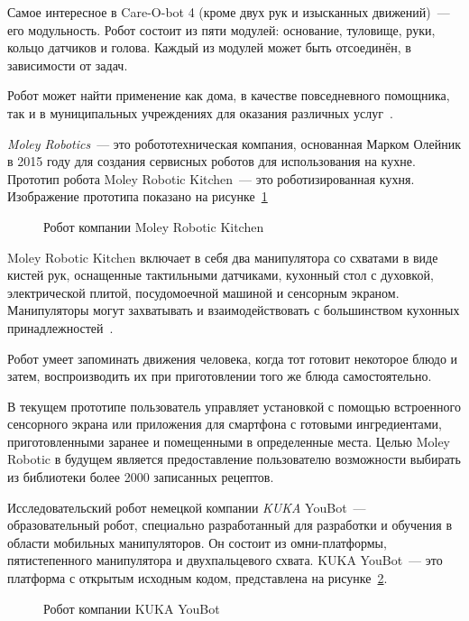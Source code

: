 Самое интересное в Care-O-bot 4 (кроме двух рук и изысканных движений)~--- его модульность. Робот состоит из пяти модулей: основание, туловище, руки, кольцо датчиков и голова. Каждый из модулей может быть отсоединён, в зависимости от задач.

Робот может найти применение как дома, в качестве повседневного помощника, так и в муниципальных учреждениях для оказания различных услуг~\cite{review}.

\textit{Moley Robotics}~--- это робототехническая компания, основанная Марком Олейник в 2015 году для создания сервисных роботов для использования на кухне. Прототип робота Moley Robotic Kitchen~--- это роботизированная кухня. Изображение прототипа показано на рисунке~\ref{img:moley}

\begin{figure}[h!]
	\caption{Робот компании Moley Robotic Kitchen}
	\label{img:moley}
\end{figure}

Moley Robotic Kitchen включает в себя два манипулятора со схватами в виде кистей рук, оснащенные тактильными датчиками, кухонный стол с духовкой, электрической плитой, посудомоечной машиной и сенсорным экраном. Манипуляторы могут захватывать и взаимодействовать с большинством кухонных принадлежностей~\cite{moley}.

Робот умеет запоминать движения человека, когда тот готовит некоторое блюдо и затем, воспроизводить их при приготовлении того же блюда самостоятельно.

В текущем прототипе пользователь управляет установкой с помощью встроенного сенсорного экрана или приложения для смартфона с готовыми ингредиентами, приготовленными заранее и помещенными в определенные места. Целью Moley Robotic в будущем является предоставление пользователю возможности выбирать из библиотеки более 2000 записанных рецептов.

Исследовательский робот немецкой компании \textit{KUKA} YouBot~--- образовательный робот, специально разработанный для разработки и обучения в области мобильных манипуляторов. Он состоит из омни-платформы, пятистепенного манипулятора и двухпальцевого схвата. KUKA YouBot~--- это платформа с открытым исходным кодом, представлена на рисунке~\ref{img:ky}.

\begin{figure}[h!]
	\caption{Робот компании KUKA YouBot}
	\label{img:ky}
\end{figure}

\newpage